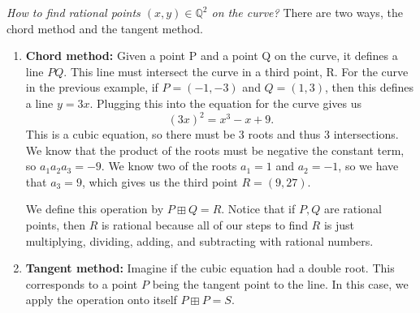 \textit{How to find rational points $(x,y) \in \mathbb{Q}^2$ on the curve?} There are two ways, the chord method and the tangent method.
\begin{enumerate}
    \item \textbf{Chord method:} Given a point P and a point Q on the curve, it defines a line $PQ$. This line must intersect the curve in a third point, R. For the curve in the previous example, if $P=(-1, -3)$ and $Q=(1, 3)$, then this defines a line $y=3x$. Plugging this into the equation for the curve gives us
    $$(3x)^2 = x^3 - x + 9.$$
    This is a cubic equation, so there must be 3 roots and thus 3 intersections. We know that the product of the roots must be negative the constant term, so $a_1 a_2 a_3 = -9$. We know two of the roots $a_1 = 1$ and $a_2 = -1$, so we have that $a_3 = 9$, which gives us the third point $R = (9, 27)$.

    We define this operation by $P \boxplus Q = R$. Notice that if $P, Q$ are rational points, then $R$ is rational because all of our steps to find $R$ is just multiplying, dividing, adding, and subtracting with rational numbers.

    \begin{center}
        \def\svgwidth{0.35\linewidth}
        
    \end{center}


    \pagebreak
    \item \textbf{Tangent method:} Imagine if the cubic equation had a double root. This corresponds to a point $P$ being the tangent point to the line. In this case, we apply the operation onto itself $P \boxplus P = S$.

    \begin{center}
        \def\svgwidth{0.35\linewidth}
        
    \end{center}
\end{enumerate}
